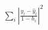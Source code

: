 \documentclass[10pt]{article}
\begin{document}
\begin{align*}\sum_i \left| \frac{y_i - \hat{y}_i}{1 - h_i} \right|^2\end{align*}
\end{document}

